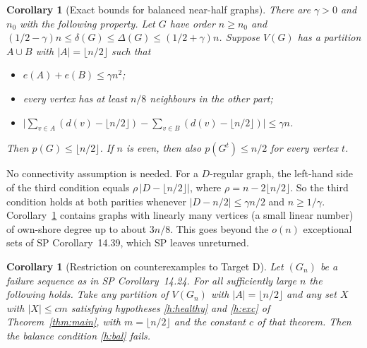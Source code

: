 \documentclass[11pt]{article}
\newtheorem{corollary}[theorem]{Corollary}
\theoremstyle{definition}
\begin{document}
\begin{corollary}[Exact bounds for balanced near-half graphs]\label{cor:class}
There are $\gamma>0$ and $n_0$ with the following property. Let $G$ have order $n\ge n_0$ and $(1/2-\gamma)n\le\delta(G)\le\Delta(G)\le(1/2+\gamma)n$. Suppose $V(G)$ has a partition $A\cup B$ with $|A|=\lfloor n/2\rfloor$ such that
\begin{itemize}[nosep]
\item $e(A)+e(B)\le\gamma n^2$;
\item every vertex has at least $n/8$ neighbours in the other part;
\item $\bigl|\sum_{v\in A}(d(v)-\lfloor n/2\rfloor)-\sum_{v\in B}(d(v)-\lfloor n/2\rfloor)\bigr|\le\gamma n$.
\end{itemize}
Then $p(G)\le\lfloor n/2\rfloor$. If $n$ is even, then also $p(G^t)\le n/2$ for every vertex $t$.
\end{corollary}

No connectivity assumption is needed. For a $D$-regular graph, the left-hand side of the third condition equals $\rho\,|D-\lfloor n/2\rfloor|$, where $\rho=n-2\lfloor n/2\rfloor$. So the third condition holds at both parities whenever $|D-n/2|\le\gamma n/2$ and $n\ge1/\gamma$. Corollary~\ref{cor:class} contains graphs with linearly many vertices (a small linear number) of own-shore degree up to about $3n/8$. This goes beyond the $o(n)$ exceptional sets of SP Corollary~14.39, which SP leaves unreturned.

\begin{corollary}[Restriction on counterexamples to Target D]\label{cor:failures}
Let $(G_n)$ be a failure sequence as in SP Corollary~14.24. For all sufficiently large $n$ the following holds. Take any partition of $V(G_n)$ with $|A|=\lfloor n/2\rfloor$ and any set $X$ with $|X|\le cm$ satisfying hypotheses \ref{h:healthy} and \ref{h:exc} of Theorem~\ref{thm:main}, with $m=\lfloor n/2\rfloor$ and the constant $c$ of that theorem. Then the balance condition \ref{h:bal} fails.
\end{corollary}
\end{document}
